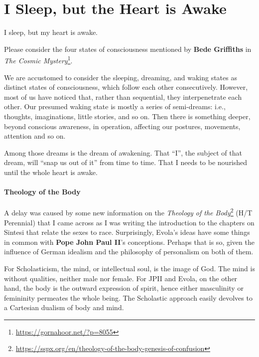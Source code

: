 \section{I Sleep, but the Heart is Awake}

\begin{quotex}
I sleep, but my heart is awake. 
\end{quotex}

Please consider the four states of consciousness mentioned by \textbf{Bede Griffiths} in \textit{The Cosmic Mystery}\footnote{\url{https://gornahoor.net/?p=8055}}.


We are accustomed to consider the sleeping, dreaming, and waking states as distinct states of consciousness, which follow each other consecutively. However, most of us have noticed that, rather than sequential, they interpenetrate each other. Our presumed waking state is mostly a series of semi-dreams: i.e., thoughts, imaginations, little stories, and so on. Then there is something deeper, beyond conscious awareness, in operation, affecting our postures, movements, attention and so on.

Among those dreams is the dream of awakening. That ``I'', the subject of that dream, will ``snap us out of it'' from time to time. That I needs to be nourished until the whole heart is awake.

\paragraph{Theology of the Body}


A delay was caused by some new information on the \textit{Theology of the Body}\footnote{\url{https://sspx.org/en/theology-of-the-body-genesis-of-confusion}} (H/T Perennial) that I came across as I was writing the introduction to the chapters on Sintesi that relate the sexes to race. Surprisingly, Evola's ideas have some things in common with \textbf{Pope John Paul II}'s conceptions. Perhaps that is so, given the influence of German idealism and the philosophy of personalism on both of them.

For Scholasticism, the mind, or intellectual soul, is the image of God. The mind is without qualities, neither male nor female. For JPII and Evola, on the other hand, the body is the outward expression of spirit, hence either masculinity or femininity permeates the whole being. The Scholastic approach easily devolves to a Cartesian dualism of body and mind.

